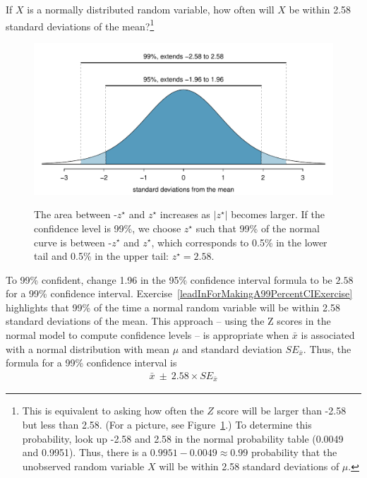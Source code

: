 \begin{exercise} \label{leadInForMakingA99PercentCIExercise}
If $X$ is a normally distributed random variable, how often will $X$ be within 2.58 standard deviations of the mean?\footnote{This is equivalent to asking how often the $Z$ score will be larger than -2.58 but less than 2.58. (For a picture, see Figure~\ref{choosingZForCI}.) To determine this probability, look up -2.58 and 2.58 in the normal probability table (0.0049 and 0.9951). Thus, there is a $0.9951-0.0049 \approx 0.99$ probability that the unobserved random variable $X$ will be within 2.58 standard deviations of $\mu$.}
\end{exercise}

\begin{figure}
\centering
\includegraphics[width=\textwidth]{ch_inference_foundations_oi_biostat/figures/choosingZForCI/choosingZForCI}
\label{choosingZForCI}
\caption{The area between -$z^{\star}$ and $z^{\star}$ increases as $|z^{\star}|$ becomes larger. If the confidence level is 99\%, we choose $z^{\star}$ such that 99\% of the normal curve is between -$z^{\star}$ and $z^{\star}$, which corresponds to 0.5\% in the lower tail and 0.5\% in the upper tail: $z^{\star}=2.58$.}
\end{figure}


To 99\% confident, change 1.96 in the 95\% confidence interval formula to be $2.58$ for a 99\% confidence interval. Exercise~\ref{leadInForMakingA99PercentCIExercise} highlights that 99\% of the time a normal random variable will be within 2.58 standard deviations of the mean. This approach -- using the Z scores in the normal model to compute confidence levels -- is appropriate when $\bar{x}$ is associated with a normal distribution with mean $\mu$ and standard deviation $SE_{\bar{x}}$. Thus, the formula for a 99\% confidence interval is
\begin{eqnarray}
\bar{x}\ \pm\ 2.58\times SE_{\bar{x}}
\label{99PercCIForMean}
\end{eqnarray}

